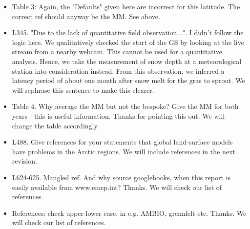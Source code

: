 \documentclass{scrartcl}
\begin{document}
\begin{itemize}
\item {\color{blue}Table 3: Again, the "Defaults" given here are incorrect for this latitude. The correct ref should anyway be the MM.}
See above.

\item {\color{blue}L345. "Due to the lack of quantitative field observation...". I didn't follow the logic here.} We qualitatively checked the start of the GS by looking at the live stream from a nearby webcam. This cannot be used for a quantitative analysis. Hence, we take the measurement of snow depth at a meteorological station into consideration instead. From this observation, we inferred a latency period of about one month after snow melt for the gras to sprout. We will rephrase this sentence to make this clearer.

\item {\color{blue}Table 4. Why average the MM but not the bespoke? Give the MM for both years - this is useful information.}
Thanks for pointing this out. We will change the table accordingly.

\item {\color{blue}L488. Give references for your statements that global land-surface models have problems in the Arctic regions.}
We will include references in the next revision.

\item {\color{blue}L624-625. Mangled ref. And why source googlebooks, when this report is easily available from www.emep.int?}
Thanks. We will check our list of references.

\item {\color{blue}References: check upper-lower case, in e.g. AMBIO, grennfelt etc.}
Thanks. We will check our list of references.
 

\end{itemize}
\end{document}
